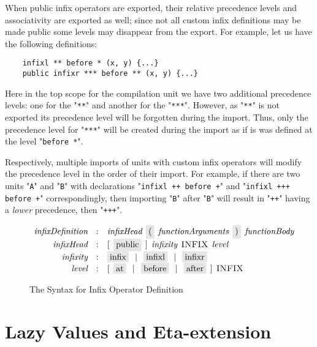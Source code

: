 When public infix operators are exported, their relative precedence levels and associativity are exported as well; since not all 
custom infix definitions may be made public some levels may disappear from the export. For example, let us have the following definitions:

\begin{lstlisting}
    infixl ** before * (x, y) {...}
    public infixr *** before ** (x, y) {...}
\end{lstlisting}

Here in the top scope for the compilation unit we have two additional precedence levels: one for the "\lstinline|**|" and another for the "\lstinline|***|".
However, as  "\lstinline|**|" is not exported its precedence level will be forgotten during the import. Thus, only the precedence level for
"\lstinline|***|" will be created during the import as if is was defined at the level  "\lstinline|before *|".

Respectively, multiple imports of units with custom infix operators will modify the precedence level in the order of their import. For example,
if there are two units  "\lstinline|A|" and  "\lstinline|B|" with declarations "\lstinline|infixl ++ before +|" and "\lstinline|infixl +++ before +|"
correspondingly, then importing  "\lstinline|B|" after  "\lstinline|B|" will result in "\lstinline|++|" having a \emph{lower} precedence, then
"\lstinline|+++|".

\begin{figure}[t]
  \[
    \begin{array}{rcl}
      \defterm{infixDefinition} & : & \nonterm{infixHead}\s\term{(}\s\nonterm{functionArguments}\s\term{)}\s\nonterm{functionBody}\\
      \defterm{infixHead}       & : & [\s\term{public}\s]\s\nonterm{infixity}\s\token{INFIX}\s\nonterm{level}\\
      \defterm{infixity}        & : & \term{infix}\alt\term{infixl}\alt\term{infixr}\\
      \defterm{level}           & : & [\s\term{at}\alt\term{before}\alt\term{after}\s]\s\token{INFIX}
    \end{array}
  \]
  \caption{The Syntax for Infix Operator Definition}
  \label{custom_infix_construct}
\end{figure}

\section{Lazy Values and Eta-extension}

